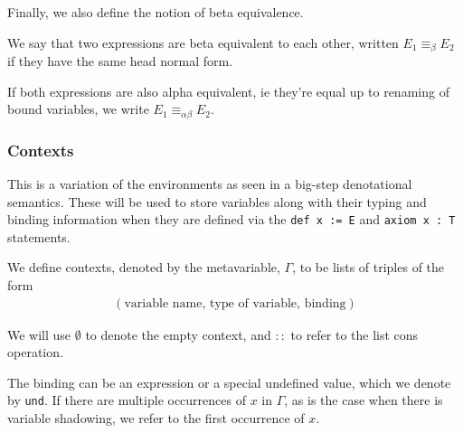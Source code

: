\documentclass{article}
\begin{document}

Finally, we also define the notion of beta equivalence. 

\begin{definition} 
We say that two expressions are beta equivalent to each other, written
$E_1 \equiv_\beta E_2$ if they have the same head normal form.

If both expressions are also alpha equivalent, ie
they're equal up to renaming of bound variables, we write
$E_1 \equiv_{\alpha \beta} E_2$.
\end{definition}

\subsubsection{Contexts}
This is a variation of the environments as seen in a big-step denotational
semantics.
These will be used to store variables along with their typing and binding information
when they are defined via the \texttt{def x := E} and \verb|axiom x : T| statements.

We define contexts, denoted by the metavariable, $\Gamma$, to be lists of
triples of the form
\begin{align*}
  (\text{variable name}, \, \text{type of variable}, \, \text{binding})
\end{align*}

We will use $\emptyset$ to denote the empty context, and $::$ to refer to the
list cons operation.

The binding can be an expression or a special undefined value, which we denote by
\verb|und|.
If there are multiple occurrences of $x$ in $\Gamma$,
as is the case when there is variable shadowing, we refer to the first occurrence
of $x$.

\end{document}
